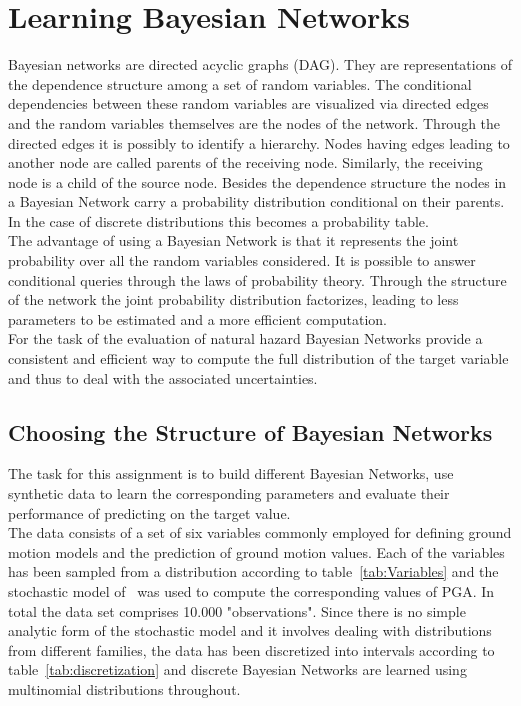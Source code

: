 
\chapter{Learning Bayesian Networks} %

\label{Chapter2} %

Bayesian networks are directed acyclic graphs (DAG). They are representations of the dependence structure among a set of random variables. The conditional dependencies between these random variables are visualized via directed edges and the random variables themselves are the nodes of the network. Through the directed edges it is possibly to identify a hierarchy. Nodes having edges leading to another node are called parents of the receiving node. Similarly, the receiving node is a child of the source node. Besides the dependence structure the nodes in a Bayesian Network carry a probability distribution conditional on their parents. In the case of discrete distributions this becomes a probability table.\\
The advantage of using a Bayesian Network is that it represents the joint probability over all the random variables considered. It is possible to answer conditional queries through the laws of probability theory. Through the structure of the network the joint probability distribution factorizes, leading to less parameters to be estimated and a more efficient computation.\\
For the task of the evaluation of natural hazard Bayesian Networks provide a consistent and efficient way to compute the full distribution of the target variable and thus to deal with the associated uncertainties.
\newpage


\section{Choosing the Structure of Bayesian Networks}
The task for this assignment is to build different Bayesian Networks, use synthetic data to learn the corresponding parameters and evaluate their performance of predicting on the target value.\\
The data consists of a set of six variables commonly employed for defining ground motion models and the prediction of ground motion values. Each of the variables has been sampled from a distribution according to table~\ref{tab:Variables} and the stochastic model of~\cite{boore2003} was used to compute the corresponding values of PGA. In total the data set comprises 10.000 "observations". Since there is no simple analytic form of the stochastic model and it involves dealing with distributions from different families, the data has been discretized into intervals according to table~\ref{tab:discretization} and discrete Bayesian Networks are learned using multinomial distributions throughout.

